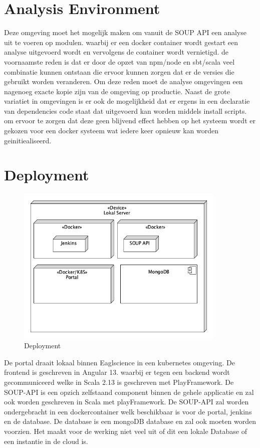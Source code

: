 \section{Analysis Environment}\label{sec:analysis-environment}
Deze omgeving moet het mogelijk maken om vanuit de SOUP API een analyse uit te voeren op modulen. waarbij er een docker container wordt gestart een analyse uitgevoerd wordt en vervolgens de container wordt vernietigd. de voornaamste reden is dat er door de opzet van npm/node en sbt/scala veel combinatie kunnen ontstaan die ervoor kunnen zorgen dat er de versies die gebruikt worden veranderen. Om deze reden moet de analyse omgevingen een nagenoeg exacte kopie zijn van de omgeving op productie. Naast de grote variatiet in omgevingen is er ook de mogelijkheid dat er ergens in een declaratie van dependencies code staat dat uitgevoerd kan worden middels install scripts. om ervoor te zorgen dat deze geen blijvend effect hebben op het systeem wordt er gekozen voor een docker systeem wat iedere keer opnieuw kan worden geinitiealiseerd.

\section{Deployment}\label{sec:deployment}


\begin{figure}[bth]
    \myfloatalign
    \includegraphics[width=10cm]{gfx/umlet/exports/deployment}
    \caption{Deployment }
    \label{fig:deployment}
\end{figure}

De portal draait lokaal binnen Eaglscience in een kubernetes omgeving. De frontend is geschreven in Angular 13. waarbij er tegen een backend wordt gecommuniceerd welke in Scala 2.13 is geschreven met PlayFramework. De SOUP-API is een opzich zelfstaand component binnen de gehele applicatie en zal ook worden geschreven in Scala met playFramework. De SOUP-API zal worden ondergebracht in een dockercontainer welk beschikbaar is voor de portal, jenkins en de database. De database is een mongoDB database en zal ook moeten worden voorzien. Het maakt voor de werking niet veel uit of dit een lokale Database of een instantie in de cloud is.

